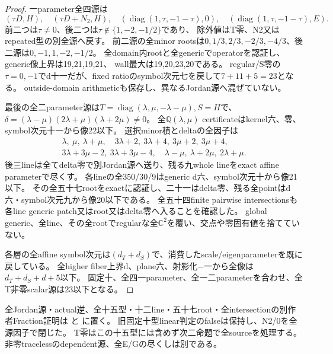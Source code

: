 \documentclass[a4paper,11pt]{ltjsarticle}
\theoremstyle{definition}
\begin{document}
\begin{proof}
一parameter全四源は
\[
 (\tau D,H),\quad(\tau D+N_2,H),\quad
 (\operatorname{diag}(1,\tau,-1-\tau),0),\quad
 (\operatorname{diag}(1,\tau,-1-\tau),E).
\]
前二つは$\tau\ne0$、後二つは$\tau\notin\{1,-2,-1/2\}$であり、
除外値はT零、N2又はrepeated型の別全源へ戻す。
前二源の全minor rootsは$0,1/3,2/3,-2/3,-4/3$、後二源は$0,-1,1,-2,-1/2$。
全domain内rootと全genericでoperatorを認証し、generic像上界は19,21,19,21、
wall最大は19,20,23,20である。
regular/S零の$\tau=0,-1$でd十一だが、fixed ratioのsymbol次元七を戻して$7+11+5=23$となる。
outside-domain arithmeticも保存し、異なるJordan源へ混ぜていない。

最後の全二parameter源は$T=\operatorname{diag}(\lambda,\mu,-\lambda-\mu),S=H$で、
$\delta=(\lambda-\mu)(2\lambda+\mu)(\lambda+2\mu)\ne0$。
全$\mathbb Q(\lambda,\mu)$ certificateはkernel六、零、symbol次元十一から像22以下。
選択minor積とdeltaの全因子は
\[
\begin{gathered}
 \lambda,\ \mu,\ \lambda+\mu,\quad
 3\lambda+2,\ 3\lambda+4,\ 3\mu+2,\ 3\mu+4,\\
 3\lambda+3\mu-2,\ 3\lambda+3\mu-4,\quad
 \lambda-\mu,\ \lambda+2\mu,\ 2\lambda+\mu.
\end{gathered}
\]
後三lineは全てdelta零で別Jordan源へ送り、残る九whole lineをexact affine parameterで尽くす。
各lineの全350/30/9はgeneric d六、symbol次元十から像21以下。
その全五十七rootをexactに認証し、二十一はdelta零、残る全pointはd六・symbol次元九から像20以下である。
全五十四finite pairwise intersectionsも各line generic patch又はroot又はdelta零へ入ることを確認した。
global generic、全line、その全rootでregularな全$\mathbb C^2$を覆い、交点や零固有値を捨てていない。

各層の全affine symbol次元は$(d_T+d_S)$で、消費したscale/eigenparameterを既に戻している。
全higher fiber上界d、plane六、射影化−一から全像は$d_T+d_S+d+5$以下。
固定十、全四一parameter、全一二parameterを合わせ、全T非零scalar源は23以下となる。
\end{proof}
全Jordan源・actual逆、全十五型・十二line・五十七root・全intersectionの別作者Fraction証明は
と
に置く。
旧固定十型linear判定のfalseは保持し、N2/0を全源因子で閉じた。
T零はこの十五型には含めず次二命題で全sourceを処理する。
非零tracelessのdependent源、全E/Gの尽くしは別である。
\end{document}
